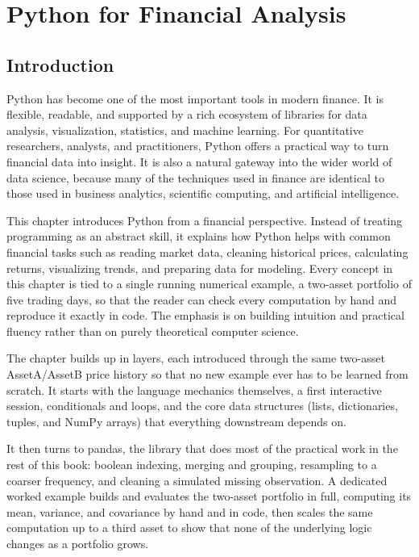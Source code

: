 \documentclass[../ai_in_finance]{subfiles}
\begin{document}
\chapter{Python for Financial Analysis}

\section{Introduction}

Python has become one of the most important tools in modern finance. It is flexible, readable, and supported by a rich ecosystem of libraries for data analysis, visualization, statistics, and machine learning. For quantitative researchers, analysts, and practitioners, Python offers a practical way to turn financial data into insight. It is also a natural gateway into the wider world of data science, because many of the techniques used in finance are identical to those used in business analytics, scientific computing, and artificial intelligence.

This chapter introduces Python from a financial perspective. Instead of treating programming as an abstract skill, it explains how Python helps with common financial tasks such as reading market data, cleaning historical prices, calculating returns, visualizing trends, and preparing data for modeling. Every concept in this chapter is tied to a single running numerical example, a two-asset portfolio of five trading days, so that the reader can check every computation by hand and reproduce it exactly in code. The emphasis is on building intuition and practical fluency rather than on purely theoretical computer science.

The chapter builds up in layers, each introduced through the same two-asset AssetA/AssetB price history so that no new example ever has to be learned from scratch. It starts with the language mechanics themselves, a first interactive session, conditionals and loops, and the core data structures (lists, dictionaries, tuples, and NumPy arrays) that everything downstream depends on.

It then turns to pandas, the library that does most of the practical work in the rest of this book: boolean indexing, merging and grouping, resampling to a coarser frequency, and cleaning a simulated missing observation. A dedicated worked example builds and evaluates the two-asset portfolio in full, computing its mean, variance, and covariance by hand and in code, then scales the same computation up to a third asset to show that none of the underlying logic changes as a portfolio grows.
\end{document}

